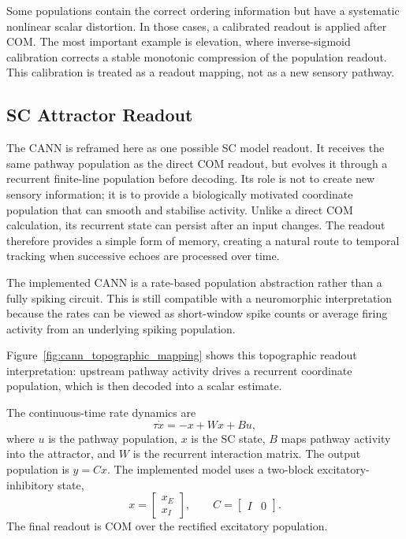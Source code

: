 Some populations contain the correct ordering information but have a systematic nonlinear scalar distortion. In those cases, a calibrated readout is applied after COM. The most important example is elevation, where inverse-sigmoid calibration corrects a stable monotonic compression of the population readout. This calibration is treated as a readout mapping, not as a new sensory pathway.

\subsection{SC Attractor Readout}

The CANN is reframed here as one possible SC model readout. It receives the same pathway population as the direct COM readout, but evolves it through a recurrent finite-line population before decoding. Its role is not to create new sensory information; it is to provide a biologically motivated coordinate population that can smooth and stabilise activity. Unlike a direct COM calculation, its recurrent state can persist after an input changes. The readout therefore provides a simple form of memory, creating a natural route to temporal tracking when successive echoes are processed over time.

The implemented CANN is a rate-based population abstraction rather than a fully spiking circuit. This is still compatible with a neuromorphic interpretation because the rates can be viewed as short-window spike counts or average firing activity from an underlying spiking population.



Figure~\ref{fig:cann_topographic_mapping} shows this topographic readout interpretation: upstream pathway activity drives a recurrent coordinate population, which is then decoded into a scalar estimate.

The continuous-time rate dynamics are
\begin{equation}
    \tau\dot{x} = -x + Wx + Bu,
\end{equation}
where $u$ is the pathway population, $x$ is the SC state, $B$ maps pathway activity into the attractor, and $W$ is the recurrent interaction matrix. The output population is $y=Cx$. The implemented model uses a two-block excitatory-inhibitory state,
\begin{equation}
    x=
    \begin{bmatrix}
        x_E\\
        x_I
    \end{bmatrix},
    \qquad
    C=\begin{bmatrix}I&0\end{bmatrix}.
\end{equation}
The final readout is COM over the rectified excitatory population.

